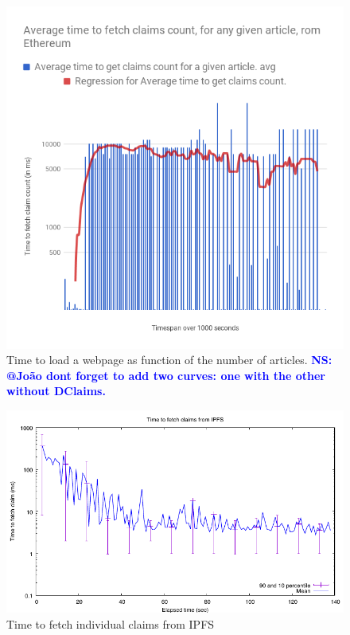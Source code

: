 \documentclass[letterpaper,twocolumn,10pt]{article}
\newcommand{\note}[1]{\textcolor{blue}{\bf #1}}
\begin{document}
\begin{figure}[t]
  \centering
  \includegraphics[width=\columnwidth]{mock-figures/ethereumfetch.png}
  \vspace{-10pt}
  \caption{Time to load a webpage as function of the number of articles. \note{NS: @João dont forget to add two curves: one with the other without DClaims.}}
  \label{fig:ethereumfetch}
\end{figure}

\begin{figure}[t]
  \centering
  \includegraphics[width=\columnwidth]{mock-figures/ipfsfetch.pdf}
  \vspace{-10pt}
  \caption{Time to fetch individual claims from IPFS}
  \label{fig:ipfsfetch}
\end{figure}
\end{document}
